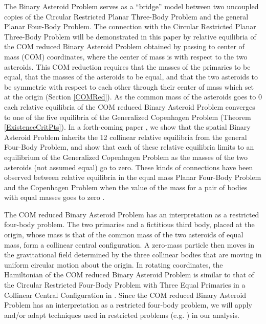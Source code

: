 \documentclass[12pt]{article}
\begin{document}
The Binary Asteroid Problem serves as a ``bridge'' model between two uncoupled copies of the Circular Restricted Planar Three-Body Problem and the general Planar Four-Body Problem. The connection with the Circular Restricted Planar Three-Body Problem will be demonstrated in this paper by relative equilibria of the COM reduced Binary Asteroid Problem obtained by passing to center of mass (COM) coordinates, where the center of mass is with respect to the two asteroids. This COM reduction requires that the masses of the primaries to be equal, that the masses of the asteroids to be equal, and that the two asteroids to be symmetric with respect to each other through their center of mass which set at the origin (Section \ref{COMRed}). As the common mass of the asteroids goes to $0$ each relative equilibria of the COM reduced Binary Asteroid Problem converges to one of the five equilibria of the Generalized Copenhagen Problem (Theorem \ref{ExistenceCritPts}). In a forth-coming paper \cite{Bakker}, we show that the spatial Binary Asteroid Problem inherits the 12 collinear relative equilibria from the general Four-Body Problem, and show that each of these relative equilibria limits to an equilibrium of the Generalized Copenhagen Problem as the masses of the two asteroids (not assumed equal) go to zero. These kinds of connections have been observed between relative equilibria in the equal mass Planar Four-Body Problem \cite{Simo} and the Copenhagen Problem when the value of the mass for a pair of bodies with equal masses goes to zero \cite{Roy}.

The COM reduced Binary Asteroid Problem has an interpretation as a restricted four-body problem. The two primaries and a fictitious third body, placed at the origin, whose mass is that of the common mass of the two asteroids of equal mass, form a collinear central configuration. A zero-mass particle then moves in the gravitational field determined by the three collinear bodies that are moving in uniform circular motion about the origin. In rotating coordinates, the Hamiltonian of the COM reduced Binary Asteroid Problem is similar to that of the Circular Restricted Four-Body Problem with Three Equal Primaries in a Collinear Central Configuration in \cite{Llibre2021}. Since the COM reduced Binary Asteroid Problem has an interpretation as a restricted four-body problem, we will apply and/or adapt techniques used in restricted problems (e.g. \cite{Llibre2021,AlvarezRamirez2015,Stoica,meyerOffin}) in our analysis.
\end{document}
